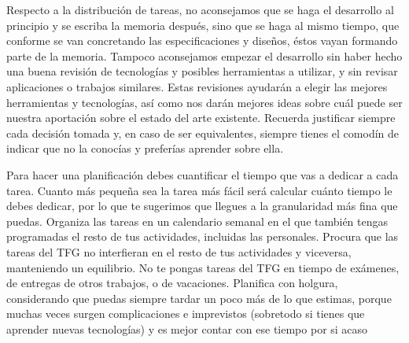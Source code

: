 Respecto a la distribución de tareas, no aconsejamos que se haga el desarrollo al principio y se escriba la memoria después, sino que se haga al mismo tiempo, que conforme se van concretando las especificaciones y diseños, éstos vayan formando parte de la memoria. Tampoco aconsejamos empezar el desarrollo sin haber hecho una buena revisión de tecnologías y posibles herramientas a utilizar, y sin revisar aplicaciones o trabajos similares. Estas revisiones ayudarán a elegir las mejores herramientas y tecnologías, así como nos darán mejores ideas sobre cuál puede ser nuestra aportación sobre el estado del arte existente. Recuerda justificar siempre cada decisión tomada y, en caso de ser equivalentes, siempre tienes el comodín de indicar que no la conocías y preferías aprender sobre ella.

Para hacer una planificación debes cuantificar el tiempo que vas a dedicar a cada tarea. Cuanto más pequeña sea la tarea más fácil será calcular cuánto tiempo le debes dedicar, por lo que te sugerimos que llegues a la granularidad más fina que puedas. Organiza las tareas en un calendario semanal en el que también tengas programadas el resto de tus actividades, incluidas las personales. Procura que las tareas del TFG no interfieran en el resto de tus actividades y viceversa, manteniendo un equilibrio. No te pongas tareas del TFG en tiempo de exámenes, de entregas de otros trabajos, o de vacaciones. Planifica con holgura, considerando que puedas siempre tardar un poco más de lo que estimas, porque muchas veces surgen complicaciones e imprevistos (sobretodo si tienes que aprender nuevas tecnologías) y es mejor contar con ese tiempo por si acaso 

